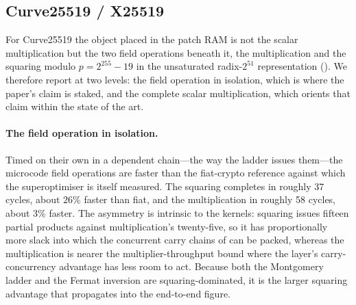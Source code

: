 \subsection{Curve25519 / X25519}
\label{sec:results-curve}

For Curve25519 the object placed in the patch RAM is not the scalar
multiplication but the two field operations beneath it, the multiplication and the
squaring modulo $p=2^{255}-19$ in the unsaturated radix-$2^{51}$ representation
(). We therefore report at two levels: the field operation in
isolation, which is where the paper's claim is staked, and the complete scalar
multiplication, which orients that claim within the state of the art.

\paragraph{The field operation in isolation.}
Timed on their own in a dependent chain---the way the ladder issues them---the
microcode field operations are faster than the fiat-crypto reference against which
the superoptimiser is itself measured. The squaring completes in roughly
37 cycles, about $26\%$ faster than fiat, and the multiplication in roughly
58 cycles, about $3\%$ faster. The asymmetry is intrinsic to the kernels: squaring
issues fifteen partial products against multiplication's twenty-five, so it has
proportionally more slack into which the concurrent carry chains of
 can be packed, whereas the multiplication is nearer the
multiplier-throughput bound where the layer's carry-concurrency advantage has less
room to act. Because both the Montgomery ladder and the Fermat inversion are
squaring-dominated, it is the larger squaring advantage that propagates into the
end-to-end figure.


